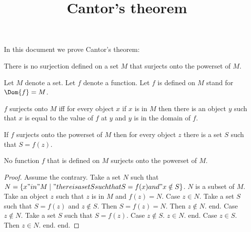 \documentclass{article}
\title{Cantor's theorem}
\author{}
\date{}
\begin{document}

  \maketitle

  In this document we prove Cantor's theorem:

  \begin{quotedtheorem}
    There is no surjection defined on a set $M$ that surjects onto the powerset of $M$.
  \end{quotedtheorem}

  \begin{forthel}

    Let $M$ denote a set. Let $f$ denote a function.
    Let $f$ is defined on $M$ stand for $\Dom{f} = M$.

    \begin{definition}
      $f$ surjects onto $M$ iff
        for every object $x$ if $x$ is in $M$ then there is an object $y$ such that
          $x$ is equal to the value of $f$ at $y$ and $y$ is in the domain of $f$.
    \end{definition}

    \begin{lemma}
      If $f$ surjects onto the powerset of $M$ then for every object $z$ there is a set $S$
        such that $S = f(z)$.
    \end{lemma}

    \begin{theorem}[Cantor]
      No function $f$ that is defined on $M$ surjects onto the powerset of $M$.
    \end{theorem}
    \begin{proof}
      Assume the contrary.
      Take a set $N$ such that $N = \{ x "in" M \mid "there is a set S such that S = f(x) and" x \notin S \}$.
      $N$ is a subset of $M$.
      Take an object $z$ such that $z$ is in $M$ and $f(z) = N$.
      Case $z \in N$.
        Take a set $S$ such that $S = f(z)$ and $z \notin S$.
        Then $S = f(z) = N$. Then $z \notin N$.
      end.
      Case $z \notin N$.
        Take a set $S$ such that $S = f(z)$.
        Case $z \notin S$.
          $z \in N$.
        end.
        Case $z \in S$.
          Then $z \in N$.
        end.
      end.
    \end{proof}
  \end{forthel}
\end{document}
